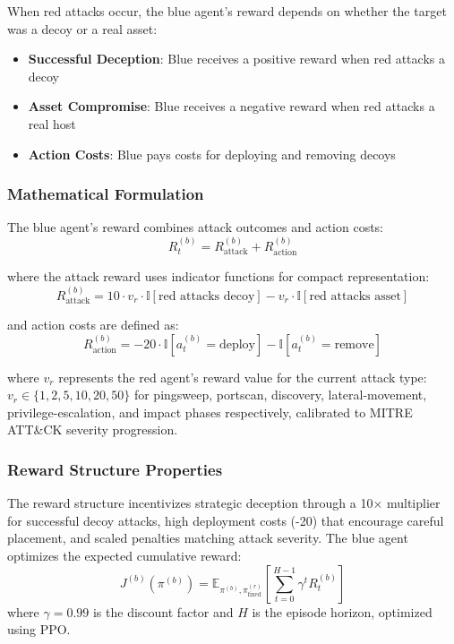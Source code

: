\documentclass[12pt,oneside]{article}
\begin{document}
When red attacks occur, the blue agent's reward depends on whether the target was a decoy or a real asset:
\begin{itemize}
\item \textbf{Successful Deception}: Blue receives a positive reward when red attacks a decoy
\item \textbf{Asset Compromise}: Blue receives a negative reward when red attacks a real host
\item \textbf{Action Costs}: Blue pays costs for deploying and removing decoys
\end{itemize}

\subsubsection{Mathematical Formulation}

The blue agent's reward combines attack outcomes and action costs:
\begin{equation}
R_t^{(b)} = R_{\text{attack}}^{(b)} + R_{\text{action}}^{(b)}
\end{equation}

where the attack reward uses indicator functions for compact representation:
\begin{equation}
R_{\text{attack}}^{(b)} = 10 \cdot v_r \cdot \mathbb{I}[\text{red attacks decoy}] - v_r \cdot \mathbb{I}[\text{red attacks asset}]
\end{equation}

and action costs are defined as:
\begin{equation}
R_{\text{action}}^{(b)} = -20 \cdot \mathbb{I}[a_t^{(b)} = \text{deploy}] - \mathbb{I}[a_t^{(b)} = \text{remove}]
\end{equation}

where $v_r$ represents the red agent's reward value for the current attack type: $v_r \in \{1, 2, 5, 10, 20, 50\}$ for pingsweep, portscan, discovery, lateral-movement, privilege-escalation, and impact phases respectively, calibrated to MITRE ATT\&CK severity progression.

\subsubsection{Reward Structure Properties}

The reward structure incentivizes strategic deception through a 10× multiplier for successful decoy attacks, high deployment costs (-20) that encourage careful placement, and scaled penalties matching attack severity. The blue agent optimizes the expected cumulative reward:
\begin{equation}
J^{(b)}(\pi^{(b)}) = \mathbb{E}_{\pi^{(b)}, \pi^{(r)}_{\text{fixed}}}\left[\sum_{t=0}^{H-1} \gamma^t R_t^{(b)}\right]
\end{equation}
where $\gamma = 0.99$ is the discount factor and $H$ is the episode horizon, optimized using PPO.
\end{document}
